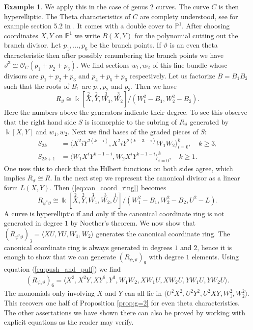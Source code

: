 \documentclass[12pt]{extarticle}
\theoremstyle{definition}
\newtheorem{example}[theorem]{Example}
\numberwithin{theorem}{section}
\newcommand{\PP}{\mathbb{P}}
\newcommand{\OO}{\mathcal{O}}
\begin{document}
\begin{example}
We apply this in the case of genus $2$ curves. The curve $C$ is then hyperelliptic. The Theta characteristics of $C$ are complety understood, see for example section 5.2 in \cite{Dolgachev}. It comes with a double cover to $\PP^1$. After choosing coordinates $X,Y$ on $\PP^1$ we write $B(X,Y)$ for the polynomial cutting out the branch divisor. Let $p_1,\ldots,p_6$ be the branch points. If $\vartheta$ is an even theta characteristic then after possibly renumbering the branch points we have $\vartheta^3 \cong \OO_C(p_1+p_2+p_3)$. We find sections $w_1,w_2$ of this line bundle whose divisors are $p_1+ p_2 +p_3$ and $p_4+p_5+p_6$ respectively. Let us factorize $B = B_1B_2$ such that the roots of $B_1$ are $p_1,p_2$ and $p_3$. Then we have
\begin{equation*}
R_\vartheta \cong \Bbbk[\overset{2}{X},\overset{2}{Y},\overset{3}{W_1},\overset{3}{W_2}] / (W_1^2 - B_1,W_2^2 - B_2).
\end{equation*}
Here the numbers above the generators indicate their degree. 
To see this observe that the right hand side $S$ is isomorphic to the subring of $R_{\vartheta}$ generated by $\Bbbk[X,Y]$ and $w_1,w_2$. Next we find bases of the graded pieces of $S$: 
\begin{align*}
S_{2k} &= \langle X^2iY^{2(k-i)},X^2iY^{2(k-3-i)}W_1W_2\rangle_{i=0}^k, \quad k\geq 3, \\
S_{2k+1} &= \langle W_1X^iY^{k-1-i},W_2X^iY^{k-1-i}\rangle_{i=0}^k,\quad k\geq 1.
\end{align*}
One uses this to check that the Hilbert functions on both sides agree, which implies $R_{\vartheta} \cong R$.
In the next step we represent the canonical divisor as a linear form $L(X,Y)$. Then (\ref{eq:can_coord_ring}) becomes
\begin{equation*}
R_{\psi^*\vartheta} \cong \Bbbk[\overset{2}{X},\overset{2}{Y},\overset{3}{W_1},\overset{3}{W_2},\overset{1}{U}]/( W_1^2 - B_1,W_2^2 - B_2,U^2 - L).
\end{equation*}
A curve is hyperelliptic if and only if the canonical coordinate ring is not generated in degree $1$ by Noether's theorem. We now show that $ (R_{\psi^* \vartheta})_3 = \langle XU,YU,W_1,W_2\rangle$ generates the canonical coordinate ring. The canonical coordinate ring is always generated in degrees $1$ and $2$, hence it is enough to show that we can generate $(R_{\psi_*\vartheta})_6$ with degree $1$ elements. Using equation (\ref{eq:push_and_pull}) we find 
\begin{align*}
(R_{\psi_*\vartheta})_6 = \langle X^3,X^2Y,XY^2,Y^3,
W_1W_2,XW_1U,XW_2U,YW_1U,YW_2U\rangle.
\end{align*}
The monomials only involving $X$ and $Y$ can all lie in $\langle U^2X^2,U^2Y^2,U^2XY,W_1^2,W_2^2\rangle$.
This recovers one half of Proposition \ref{prop:g=2} for even theta characteristics. The other assertations we have shown there can also be proved by working with explicit equations as the reader may verify. 
\end{example}
\end{document}

